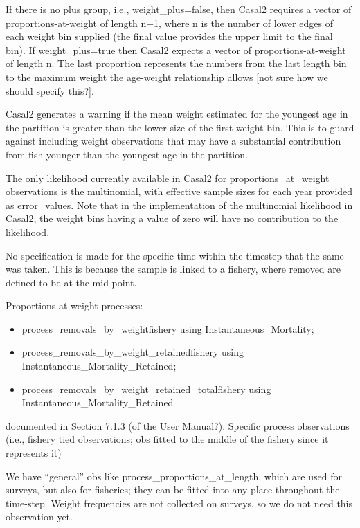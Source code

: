 \documentclass[a4paper,11pt,twoside,pdftex,draft]{article}
\begin{document}
If there is no plus group, i.e., weight\_plus=false, then Casal2 requires a vector of proportions-at-weight of length n+1, where n is the number of lower edges of each weight bin supplied (the final value provides the upper limit to the final bin). If weight\_plus=true then Casal2 expects a vector of proportions-at-weight of length n. The last proportion represents the numbers from the last length bin to the maximum weight the age-weight relationship allows [not sure how we should specify this?].

Casal2 generates a warning if the mean weight estimated for the youngest age in the partition is greater than the lower size of the first weight bin. This is to guard against including weight observations that may have a substantial contribution from fish younger than the youngest age in the partition.

The only likelihood currently available in Casal2 for proportions\_at\_weight observations is the multinomial, with effective sample sizes for each year provided as error\_values. Note that in the implementation of the multinomial likelihood in Casal2, the weight bins having a value of zero will have no contribution to the likelihood.

No specification is made for the specific time within the timestep that the same was taken. This is because the sample is linked to a fishery, where removed are defined to be at the mid-point.

Proportions-at-weight processes:

\begin{itemize}
	\item process\_removals\_by\_weightfishery using Instantaneous\_Mortality;
	\item process\_removals\_by\_weight\_retainedfishery using Instantaneous\_Mortality\_Retained;
	\item process\_removals\_by\_weight\_retained\_totalfishery using Instantaneous\_Mortality\_Retained
\end{itemize}

documented in Section 7.1.3 (of the User Manual?). Specific process observations (i.e., fishery tied observations; obs fitted to the middle of the fishery since it represents it)

We have ``general'' obs like process\_proportions\_at\_length, which are used for surveys, but also for fisheries; they can be fitted into any place throughout the time-step. Weight frequencies are not collected on surveys, so we do not need this observation yet.
\end{document}
